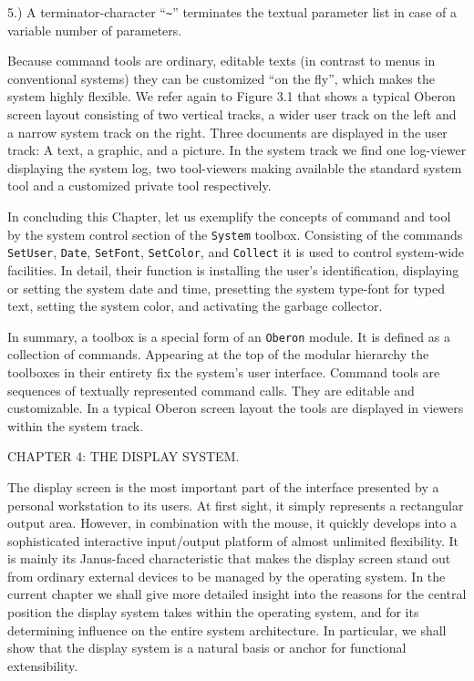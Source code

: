 5.) A terminator-character ``{\tt \~{}}'' terminates the textual parameter list in case of a variable number of parameters.

Because command tools are ordinary, editable texts (in contrast to
menus in conventional systems) they can be customized ``on the fly'',
which makes the system highly flexible. We refer again to Figure 3.1
that shows a typical Oberon screen layout consisting of two vertical
tracks, a wider user track on the left and a narrow system track on
the right. Three documents are displayed in the user track: A text, a
graphic, and a picture. In the system track we find one log-viewer
displaying the system log, two tool-viewers making available the
standard system tool and a customized private tool respectively.

In concluding this Chapter, let us exemplify the concepts of command
and tool by the system control section of the {\tt System\/}
toolbox. Consisting of the commands {\tt SetUser\/}, {\tt Date\/},
{\tt SetFont\/}, {\tt SetColor\/}, and {\tt Collect\/} it is used to control
system-wide facilities. In detail, their function is installing the
user's identification, displaying or setting the system date and time,
presetting the system type-font for typed text, setting the system
color, and activating the garbage collector.

In summary, a toolbox is a special form of an {\tt Oberon\/} module. It is
defined as a collection of commands. Appearing at the top of the
modular hierarchy the toolboxes in their entirety fix the system’s
user interface. Command tools are sequences of textually represented
command calls. They are editable and customizable. In a typical Oberon
screen layout the tools are displayed in viewers within the system
track.

\beginchapter CHAPTER 4: THE DISPLAY SYSTEM.

The display screen is the most important part of the interface
presented by a personal workstation to its users. At first sight, it
simply represents a rectangular output area. However, in combination
with the mouse, it quickly develops into a sophisticated interactive
input/output platform of almost unlimited flexibility. It is mainly
its Janus-faced characteristic that makes the display screen stand out
from ordinary external devices to be managed by the operating
system. In the current chapter we shall give more detailed insight
into the reasons for the central position the display system takes
within the operating system, and for its determining influence on the
entire system architecture. In particular, we shall show that the
display system is a natural basis or anchor for functional
extensibility.

